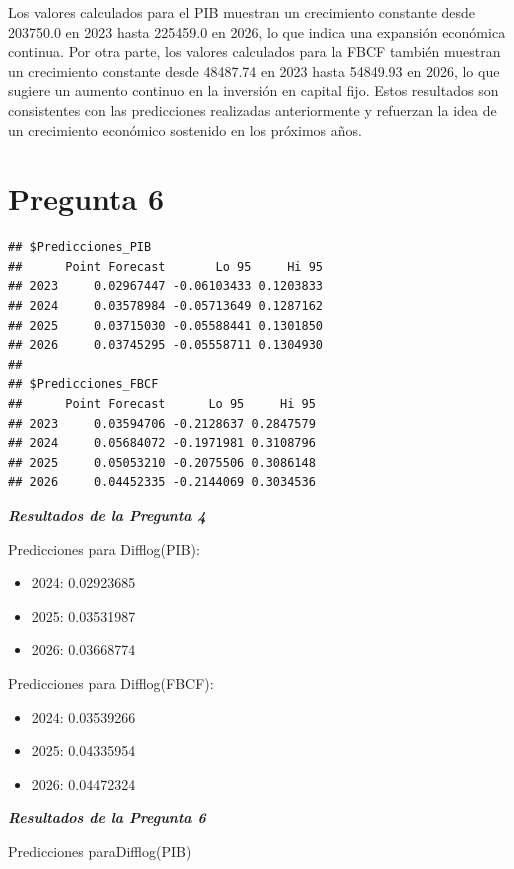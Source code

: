 \documentclass[
  12pt,
]{article}
\providecommand{\tightlist}{%
  \setlength{\itemsep}{0pt}\setlength{\parskip}{0pt}}
\begin{document}
Los valores calculados para el PIB muestran un crecimiento constante
desde 203750.0 en 2023 hasta 225459.0 en 2026, lo que indica una
expansión económica continua. Por otra parte, los valores calculados
para la FBCF también muestran un crecimiento constante desde 48487.74 en
2023 hasta 54849.93 en 2026, lo que sugiere un aumento continuo en la
inversión en capital fijo. Estos resultados son consistentes con las
predicciones realizadas anteriormente y refuerzan la idea de un
crecimiento económico sostenido en los próximos años.

\section{Pregunta 6}\label{pregunta-6}

\begin{verbatim}
## $Predicciones_PIB
##      Point Forecast       Lo 95     Hi 95
## 2023     0.02967447 -0.06103433 0.1203833
## 2024     0.03578984 -0.05713649 0.1287162
## 2025     0.03715030 -0.05588441 0.1301850
## 2026     0.03745295 -0.05558711 0.1304930
## 
## $Predicciones_FBCF
##      Point Forecast      Lo 95     Hi 95
## 2023     0.03594706 -0.2128637 0.2847579
## 2024     0.05684072 -0.1971981 0.3108796
## 2025     0.05053210 -0.2075506 0.3086148
## 2026     0.04452335 -0.2144069 0.3034536
\end{verbatim}

\textbf{\emph{Resultados de la Pregunta 4}}

Predicciones para Difflog(PIB):

\begin{itemize}
\tightlist
\item
  2024: 0.02923685
\item
  2025: 0.03531987
\item
  2026: 0.03668774
\end{itemize}

Predicciones para Difflog(FBCF):

\begin{itemize}
\tightlist
\item
  2024: 0.03539266
\item
  2025: 0.04335954
\item
  2026: 0.04472324
\end{itemize}

\textbf{\emph{Resultados de la Pregunta 6}}

Predicciones paraDifflog(PIB)
\end{document}
